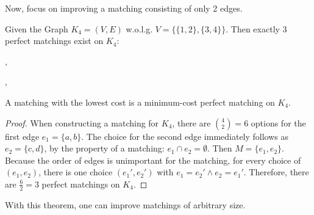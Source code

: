 Now, focus on improving a matching consisting of only 2 edges.
\begin{theorem}
  Given the Graph $K_4 = (V,E)$
  w.o.l.g. $V = \{\{1,2\},\{3,4\}\}$.
  Then exactly 3 perfect matchings exist on $K_4$:

  \vspace{0.5\baselineskip}
  \hfill
  , \hfill
  , \hfill
  \hspace{0.2\textwidth}
  \vspace{0.5\baselineskip}
 

  A matching with the lowest cost is a minimum-cost perfect matching on $K_4$.
  \label{thm:perfect_matching_k4}
\end{theorem}
\begin{proof}
  When constructing a matching for $K_4$, there are ${4 \choose 2} = 6$
  options for the first edge $e_1 = \{a,b\}$. The choice for the second edge immediately follows
  as $e_2 = \{c,d\}$, by the property of a matching: $e_1 \cap e_2 = \emptyset$.
  Then $M = \{e_1, e_2\}$. Because the order of edges is unimportant for the matching,
  for every choice of $(e_1, e_2)$, there is one choice $(e_1', e_2')$ with
  $e_1 = e_2' \wedge e_2 = e_1'$.
  Therefore, there are $\frac{6}{2} = 3$ perfect matchings on $K_4$.
\end{proof}

With this theorem, one can improve matchings of arbitrary size.

